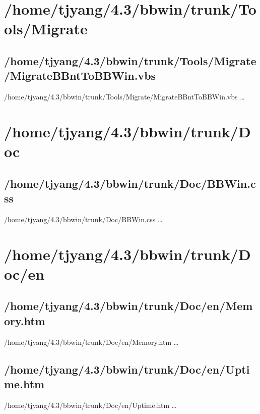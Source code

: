 \section{/home/tjyang/4.3/bbwin/trunk/Tools/Migrate}

\subsection{/home/tjyang/4.3/bbwin/trunk/Tools/Migrate/MigrateBBntToBBWin.vbs}
\lstset{numberstyle=\tiny,numbers=left,
   breaklines=true,
   stepnumber=1,numbersep=5pt,firstnumber=1,
   xleftmargin=12pt,showstringspaces=false}
\noindent /home/tjyang/4.3/bbwin/trunk/Tools/Migrate/MigrateBBntToBBWin.vbs  \ldots



\section{/home/tjyang/4.3/bbwin/trunk/Doc}



\subsection{/home/tjyang/4.3/bbwin/trunk/Doc/BBWin.css}
\lstset{numberstyle=\tiny,numbers=left,
   breaklines=true,
   stepnumber=1,numbersep=5pt,firstnumber=1,
   xleftmargin=12pt,showstringspaces=false}
\noindent /home/tjyang/4.3/bbwin/trunk/Doc/BBWin.css  \ldots



\section{/home/tjyang/4.3/bbwin/trunk/Doc/en}


\subsection{/home/tjyang/4.3/bbwin/trunk/Doc/en/Memory.htm}
\lstset{numberstyle=\tiny,numbers=left,
   breaklines=true,
   stepnumber=1,numbersep=5pt,firstnumber=1,
   xleftmargin=12pt,showstringspaces=false}
\noindent /home/tjyang/4.3/bbwin/trunk/Doc/en/Memory.htm  \ldots



\subsection{/home/tjyang/4.3/bbwin/trunk/Doc/en/Uptime.htm}
\lstset{numberstyle=\tiny,numbers=left,
   breaklines=true,
   stepnumber=1,numbersep=5pt,firstnumber=1,
   xleftmargin=12pt,showstringspaces=false}
\noindent /home/tjyang/4.3/bbwin/trunk/Doc/en/Uptime.htm  \ldots



